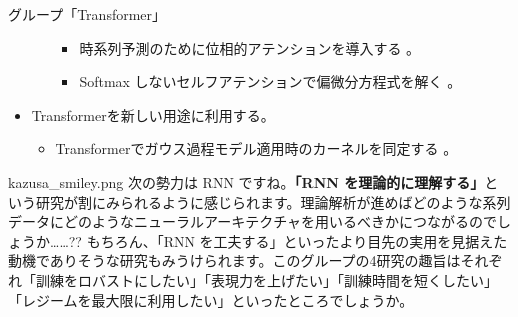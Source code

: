 \documentclass[b5paper,xelatex,ja=standard,10pt]{bxjsarticle}
\begin{document}
\begin{PROP}[left=0pt]{グループ「Transformer」}
\begin{itemize}
\begin{itemize}
\begin{itemize}
      \item 時系列予測のために位相的アテンションを導入する \cite{SebastianZeng2021}。
      \item Softmax しないセルフアテンションで偏微分方程式を解く \cite{ShuhaoCao2021}。
    \end{itemize}
  \end{itemize}
  \vspace{6pt}
  \item Transformerを新しい用途に利用する。
  \begin{itemize}
    \item Transformerでガウス過程モデル適用時のカーネルを同定する \cite{FergusSimpson2021}。
  \end{itemize}
\end{itemize}
\end{PROP}
\vspace{1pt}

\begin{SERIFU}[colback=PaleIris, colbacktitle=PaleIris2]{kazusa_smiley.png}
次の勢力は RNN ですね。\textbf{「RNN を理論的に理解する」}という研究が割にみられるように感じられます。理論解析が進めばどのような系列データにどのようなニューラルアーキテクチャを用いるべきかにつながるのでしょうか……?? もちろん、「RNN を工夫する」といったより目先の実用を見据えた動機でありそうな研究もみうけられます。このグループの4研究の趣旨はそれぞれ「訓練をロバストにしたい」「表現力を上げたい」「訓練時間を短くしたい」「レジームを最大限に利用したい」といったところでしょうか。
\end{SERIFU}
\end{document}
